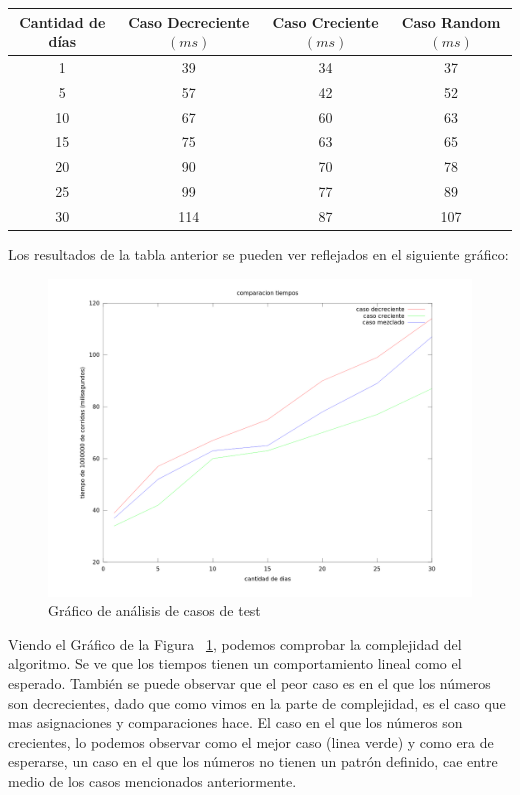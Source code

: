 \begin{center}
\begin{tabular}{|c|c|c|c|}
  \hline
  Cantidad de días & Caso Decreciente $(ms)$   & Caso Creciente $(ms)$ & Caso Random $(ms)$ \\
  \hline
  1        & 39            & 34         & 37        \\
  \hline
  5        & 57            & 42         & 52        \\
  \hline
  10        & 67           & 60        & 63       \\
  \hline
  15        & 75            & 63        & 65        \\
  \hline
  20  	   & 90          & 70      & 78        \\
  \hline
  25        & 99            & 77        & 89        \\
  \hline
  30	   & 114          & 87      & 107        \\
  \hline
\end{tabular}
\end{center}

\indent Los resultados de la tabla anterior se pueden ver reflejados en el siguiente gráfico:

\begin{figure}[h]
\centering                                                       
        \includegraphics[width=400pt]{./figs/p1Tiempos.png}
	\caption{Gráfico de análisis de casos de test}
	\label{fig:p1tiempos}
\end{figure}


\indent Viendo el Gráfico de la Figura ~\ref{fig:p1tiempos}, podemos comprobar la complejidad del algoritmo. Se ve que los tiempos tienen un comportamiento lineal como el esperado. También se puede observar que el peor caso es en el que los números son decrecientes, dado que como vimos en la parte de complejidad, es el caso que mas asignaciones y comparaciones hace. El caso en el que los números son crecientes, lo podemos observar como el mejor caso (linea verde) y como era de esperarse, un caso en el que los números no tienen un patrón definido, cae entre medio de los casos mencionados anteriormente. \\


